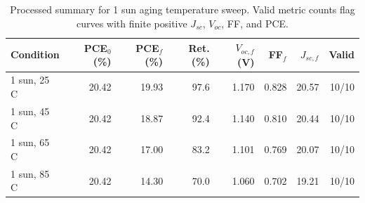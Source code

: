 \begin{table}[H]
\centering
\caption{Processed summary for 1 sun aging temperature sweep. Valid metric counts flag curves with finite positive $J_{sc}$, $V_{oc}$, FF, and PCE.}
\label{tab:baseline_pin_stress_matrix_jv_001_summary}
\begin{tabular}{@{}lrrrrrrr@{}}
\toprule
Condition & PCE$_0$ (\%) & PCE$_f$ (\%) & Ret. (\%) & $V_{oc,f}$ (V) & FF$_f$ & $J_{sc,f}$ & Valid \\
\midrule
1 sun, 25 C & 20.42 & 19.93 & 97.6 & 1.170 & 0.828 & 20.57 & 10/10 \\
1 sun, 45 C & 20.42 & 18.87 & 92.4 & 1.140 & 0.810 & 20.44 & 10/10 \\
1 sun, 65 C & 20.42 & 17.00 & 83.2 & 1.101 & 0.769 & 20.07 & 10/10 \\
1 sun, 85 C & 20.42 & 14.30 & 70.0 & 1.060 & 0.702 & 19.21 & 10/10 \\
\bottomrule
\end{tabular}
\end{table}

